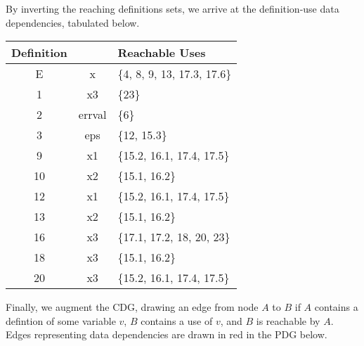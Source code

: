 \documentclass{article}
\newcommand\s[1]{\{#1\}}
\newcommand\varfamily{\ttfamily}  %
\begin{document}
\begin{enumerate}
    By inverting the reaching definitions sets, we arrive at the
    definition-use data dependencies, tabulated below.
    \begin{center}
      \begin{tabular}{c>{\varfamily}cl}
        \toprule
        Definition
        & \multicolumn{1}{c}{Variable}
        & Reachable Uses
        \\
        \midrule
        E  & x      & \s{4, 8, 9, 13, 17.3, 17.6} \\
        1  & x3     & \s{23} \\
        2  & errval & \s{6} \\
        3  & eps    & \s{12, 15.3} \\
        9  & x1     & \s{15.2, 16.1, 17.4, 17.5} \\
        10 & x2     & \s{15.1, 16.2} \\
        12 & x1     & \s{15.2, 16.1, 17.4, 17.5} \\
        13 & x2     & \s{15.1, 16.2} \\
        16 & x3     & \s{17.1, 17.2, 18, 20, 23} \\
        18 & x3     & \s{15.1, 16.2} \\
        20 & x3     & \s{15.2, 16.1, 17.4, 17.5} \\
        \bottomrule
      \end{tabular}
    \end{center}

    Finally, we augment the CDG, drawing an edge from node $A$ to $B$
    if $A$ contains a defintion of some variable $v$, $B$ contains a
    use of $v$, and $B$ is reachable by $A$. Edges representing data
    dependencies are drawn in red in the PDG below.

    \begin{center}
      \begin{minipage}[b]{.8\linewidth}
        \begin{center}
          \CDG
\end{center}
\end{minipage}
\end{center}
\end{enumerate}
\end{document}
